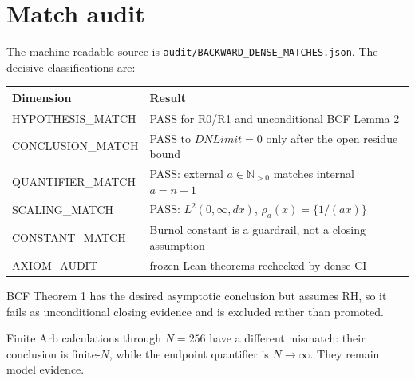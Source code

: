 \section{Match audit}
The machine-readable source is \texttt{audit/BACKWARD\_DENSE\_MATCHES.json}.
The decisive classifications are:
\begin{center}
\begin{tabular}{|l|l|}
\hline
Dimension & Result\\
\hline
HYPOTHESIS\_MATCH & PASS for R0/R1 and unconditional BCF Lemma 2\\
\hline
CONCLUSION\_MATCH & PASS to $DNLimit=0$ only after the open residue bound\\
\hline
QUANTIFIER\_MATCH & PASS: external $a\in\mathbb N_{>0}$ matches internal $a=n+1$\\
\hline
SCALING\_MATCH & PASS: $L^2(0,\infty,dx)$, $\rho_a(x)=\{1/(ax)\}$\\
\hline
CONSTANT\_MATCH & Burnol constant is a guardrail, not a closing assumption\\
\hline
AXIOM\_AUDIT & frozen Lean theorems rechecked by dense CI\\
\hline
\end{tabular}
\end{center}

BCF Theorem 1 has the desired asymptotic conclusion but assumes RH, so it fails as unconditional closing evidence and is excluded rather than promoted.

Finite Arb calculations through $N=256$ have a different mismatch: their conclusion is finite-$N$, while the endpoint quantifier is $N\to\infty$. They remain model evidence.